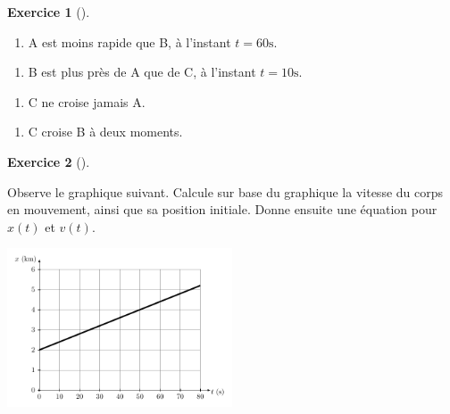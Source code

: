 \documentclass[
  letterpaper,
  DIV=11,
  numbers=noendperiod]{scrartcl}
\providecommand{\tightlist}{%
  \setlength{\itemsep}{0pt}\setlength{\parskip}{0pt}}\usepackage{longtable,booktabs,array}
\theoremstyle{definition}
\newtheorem{exercise}{Exercice}[section]
\theoremstyle{definition}
\theoremstyle{remark}
\begin{document}
\begin{exercise}[]
\begin{enumerate}
\def\labelenumi{\arabic{enumi}.}
\setcounter{enumi}{4}
\tightlist
\item
  A est moins rapide que B, à l'instant \(t=60\text{s}\).
\end{enumerate}

\vspace{2cm}

\begin{enumerate}
\def\labelenumi{\arabic{enumi}.}
\setcounter{enumi}{5}
\tightlist
\item
  B est plus près de A que de C, à l'instant \(t=10\text{s}\).
\end{enumerate}

\vspace{2cm}

\begin{enumerate}
\def\labelenumi{\arabic{enumi}.}
\setcounter{enumi}{6}
\tightlist
\item
  C ne croise jamais A.
\end{enumerate}

\vspace{2cm}

\begin{enumerate}
\def\labelenumi{\arabic{enumi}.}
\setcounter{enumi}{7}
\tightlist
\item
  C croise B à deux moments.
\end{enumerate}

\vspace{2cm}

\end{exercise}

\newpage

\begin{exercise}[]\protect\hypertarget{exr-calcul-2}{}\label{exr-calcul-2}

Observe le graphique suivant. Calcule sur base du graphique la vitesse
du corps en mouvement, ainsi que sa position initiale. Donne ensuite une
équation pour \(x(t)\) et \(v(t)\).

\begin{center}
\includegraphics[width=0.5\textwidth,height=\textheight]{figures/mru/fig12.pdf}
\end{center}

\end{exercise}
\end{document}
